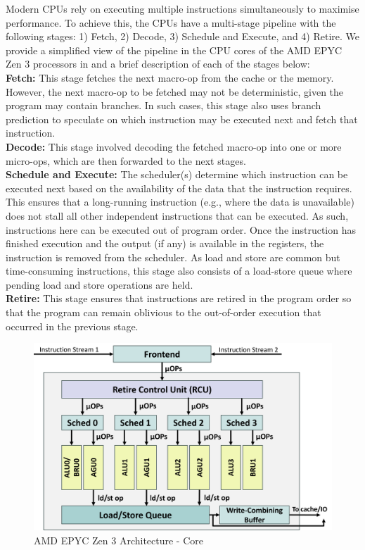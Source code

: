 Modern CPUs rely on executing multiple instructions simultaneously to maximise performance.
To achieve this, the CPUs have a multi-stage pipeline with the following stages: 1) Fetch, 2) Decode, 3) Schedule and Execute, and 4) Retire.
We provide a simplified view of the pipeline in the CPU cores of the AMD EPYC Zen 3 processors in  and a brief description of each of the stages below:\\
\textbf{Fetch: } This stage fetches the next macro-op from the cache or the memory. 
However, the next macro-op to be fetched may not be deterministic, given the program may contain branches. 
In such cases, this stage also uses branch prediction to speculate on which instruction may be executed next and fetch that instruction.\\
\textbf{Decode: } This stage involved decoding the fetched macro-op into one or more micro-ops, which are then forwarded to the next stages.\\
\textbf{Schedule and Execute: } The scheduler(s) determine which instruction can be executed next based on the availability of the data that the instruction requires. 
This ensures that a long-running instruction (e.g., where the data is unavailable) does not stall all other independent instructions that can be executed.
As such, instructions here can be executed out of program order. 
Once the instruction has finished execution and the output (if any) is available in the registers, the instruction is removed from the scheduler.
As load and store are common but time-consuming instructions, this stage also consists of a load-store queue where pending load and store operations are held. \\
\textbf{Retire: } This stage ensures that instructions are retired in the program order so that the program can remain oblivious to the out-of-order execution that occurred in the previous stage.

\begin{figure}[!htb]
    \centering
    \includegraphics[width=\columnwidth]{figures/interconnect-sc/amd_arch/core.png}
    \caption{AMD EPYC Zen 3 Architecture - Core}
    \label{fig:amd-core}
\end{figure}

